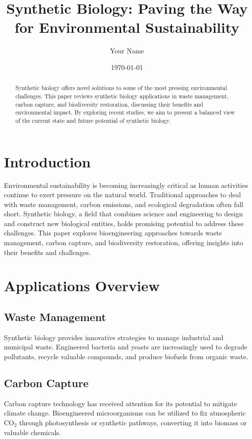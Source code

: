 \documentclass{article}
\title{Synthetic Biology: Paving the Way for Environmental Sustainability}
\author{Your Name}
\date{\today}
\begin{document}
\maketitle

\begin{abstract}
Synthetic biology offers novel solutions to some of the most pressing environmental challenges. This paper reviews synthetic biology applications in waste management, carbon capture, and biodiversity restoration, discussing their benefits and environmental impact. By exploring recent studies, we aim to present a balanced view of the current state and future potential of synthetic biology.
\end{abstract}

\section{Introduction}
Environmental sustainability is becoming increasingly critical as human activities continue to exert pressure on the natural world. Traditional approaches to deal with waste management, carbon emissions, and ecological degradation often fall short. Synthetic biology, a field that combines science and engineering to design and construct new biological entities, holds promising potential to address these challenges. This paper explores bioengineering approaches towards waste management, carbon capture, and biodiversity restoration, offering insights into their benefits and challenges.

\section{Applications Overview}

\subsection{Waste Management}
Synthetic biology provides innovative strategies to manage industrial and municipal waste. Engineered bacteria and yeasts are increasingly used to degrade pollutants, recycle valuable compounds, and produce biofuels from organic waste.

\subsection{Carbon Capture}
Carbon capture technology has received attention for its potential to mitigate climate change. Bioengineered microorganisms can be utilized to fix atmospheric CO$_2$ through photosynthesis or synthetic pathways, converting it into biomass or valuable chemicals.
\end{document}
